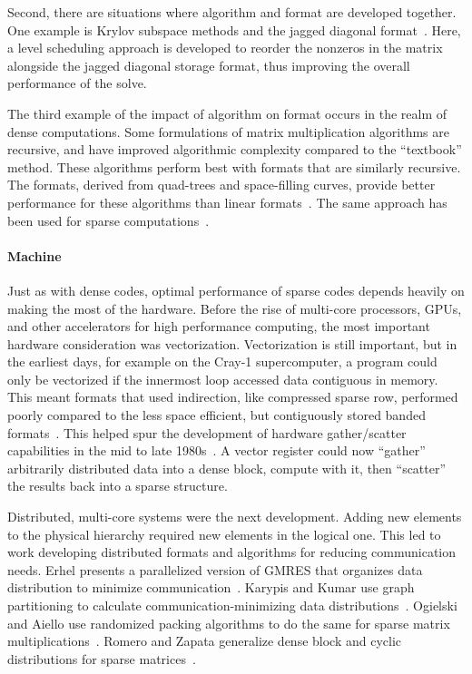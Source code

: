 Second, there are situations where algorithm and format are developed together.
One example is Krylov subspace methods and the jagged diagonal format~\cite{saad1989krylov,montagne2004optimal}.
Here, a level scheduling approach is developed to reorder the nonzeros in the matrix alongside the jagged diagonal storage format, thus improving the overall performance of the solve.

The third example of the impact of algorithm on format occurs in the realm of dense computations.
Some formulations of matrix multiplication algorithms are recursive, and have improved algorithmic complexity compared to the ``textbook'' method.
These algorithms perform best with formats that are similarly recursive.
The formats, derived from quad-trees and space-filling curves, provide better performance for these algorithms than linear formats~\cite{chatterjee1999recursive,chatterjee1999nonlinear}.
The same approach has been used for sparse computations~\cite{alappat2020recursive,martone2010utilizing,yzelman2012cache,haase2007hilbert}.


\paragraph{Machine}

Just as with dense codes, optimal performance of sparse codes depends heavily on making the most of the hardware.
Before the rise of multi-core processors, GPUs, and other accelerators for high performance computing, the most important hardware consideration was vectorization.
Vectorization is still important, but in the earliest days, for example on the Cray-1 supercomputer, a program could only be vectorized if the innermost loop accessed data contiguous in memory.
This meant formats that used indirection, like compressed sparse row, performed poorly compared to the less space efficient, but contiguously stored banded formats~\cite{duff1982experience}.
This helped spur the development of hardware gather/scatter capabilities in the mid to late 1980s~\cite{cleveland1987progress}.
A vector register could now \enquote{gather} arbitrarily distributed data into a dense block, compute with it, then \enquote{scatter} the results back into a sparse structure. 

Distributed, multi-core systems were the next development.
Adding new elements to the physical hierarchy required new elements in the logical one.
This led to work developing distributed formats and algorithms for reducing communication needs.
Erhel presents a parallelized version of GMRES that organizes data distribution to minimize communication~\cite{erhel1995parallel}.
Karypis and Kumar use graph partitioning to calculate communication-minimizing data distributions~\cite{karypis1998parallel}.
Ogielski and Aiello use randomized packing algorithms to do the same for sparse matrix multiplications~\cite{ogielski1993sparse}.
Romero and Zapata generalize dense block and cyclic distributions for sparse matrices~\cite{romero1995data}.

